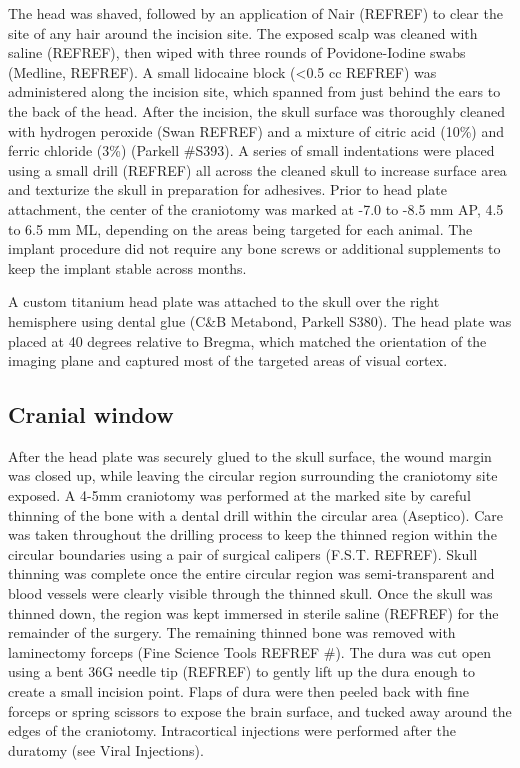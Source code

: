 The head was shaved, followed by an application of Nair (REFREF) to clear the site of any hair around the incision site. The exposed scalp was cleaned with saline (REFREF), then wiped with three rounds of Povidone-Iodine swabs (Medline, REFREF). A small lidocaine block (<0.5 cc REFREF) was administered along the incision site, which spanned from just behind the ears to the back of the head. After the incision, the skull surface was thoroughly cleaned with hydrogen peroxide (Swan REFREF) and a mixture of citric acid (10\%) and ferric chloride (3\%) (Parkell #S393). A series of small indentations were placed using a small drill (REFREF) all across the cleaned skull to increase surface area and texturize the skull in preparation for adhesives. Prior to head plate attachment, the center of the craniotomy was marked at -7.0 to -8.5 mm AP, 4.5 to 6.5 mm ML, depending on the areas being targeted for each animal. The implant procedure did not require any bone screws or additional supplements to keep the implant stable across months. 

A custom titanium head plate was attached to the skull over the right hemisphere using dental glue (C&B Metabond, Parkell S380). The head plate was placed at 40 degrees relative to Bregma, which matched the orientation of the imaging plane and captured most of the targeted areas of visual cortex. 

\subsection{Cranial window}
After the head plate was securely glued to the skull surface, the wound margin was closed up, while leaving the circular region surrounding the craniotomy site exposed. A 4-5mm craniotomy was performed at the marked site by careful thinning of the bone with a dental drill within the circular area (Aseptico). Care was taken throughout the drilling process to keep the thinned region within the circular boundaries using a pair of surgical calipers (F.S.T. REFREF). Skull thinning was complete once the entire circular region was semi-transparent and blood vessels were clearly visible through the thinned skull. Once the skull was thinned down, the region was kept immersed in sterile saline (REFREF) for the remainder of the surgery. The remaining thinned bone was removed with laminectomy forceps (Fine Science Tools REFREF #). The dura was cut open using a bent 36G needle tip (REFREF) to gently lift up the dura enough to create a small incision point. Flaps of dura were then peeled back with fine forceps or spring scissors to expose the brain surface, and tucked away around the edges of the craniotomy. Intracortical injections were performed after the duratomy (see Viral Injections).

